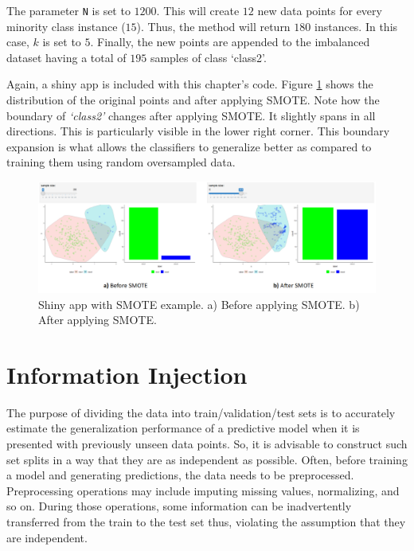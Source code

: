 \documentclass[
  11pt,
]{krantz}
\begin{document}
The parameter \texttt{N} is set to \(1200\). This will create \(12\) new data points for every minority class instance (\(15\)). Thus, the method will return \(180\) instances. In this case, \(k\) is set to \(5\). Finally, the new points are appended to the imbalanced dataset having a total of \(195\) samples of class `class2'.

Again, a shiny app is included with this chapter's code. Figure \ref{fig:shinySMOTE} shows the distribution of the original points and after applying SMOTE. Note how the boundary of \emph{`class2'} changes after applying SMOTE. It slightly spans in all directions. This is particularly visible in the lower right corner. This boundary expansion is what allows the classifiers to generalize better as compared to training them using random oversampled data.

\begin{figure}

{\centering \includegraphics[width=1\linewidth]{images/shiny_smote} 

}

\caption{Shiny app with SMOTE example. a) Before applying SMOTE. b) After applying SMOTE.}\label{fig:shinySMOTE}
\end{figure}

\hypertarget{infoinjection}{%
\section{Information Injection}\label{infoinjection}}

The purpose of dividing the data into train/validation/test sets is to accurately estimate the generalization performance of a predictive model when it is presented with previously unseen data points. So, it is advisable to construct such set splits in a way that they are as independent as possible. Often, before training a model and generating predictions, the data needs to be preprocessed. Preprocessing operations may include imputing missing values, normalizing, and so on. During those operations, some information can be inadvertently transferred from the train to the test set thus, violating the assumption that they are independent.
\end{document}
